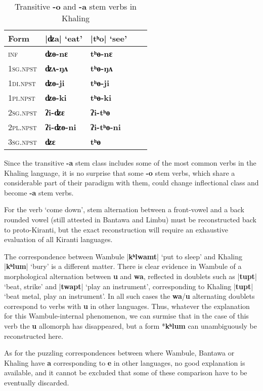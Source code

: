 \documentclass[oldfontcommands,oneside,a4paper,11pt]{article}
\newcommand{\ipa}[1]{\textbf{{\phon\mbox{#1}}}} %
\newcommand{\grise}[1]{\cellcolor{lightgray}\textbf{#1}}
\newcommand{\dhatu}[2]{|\ipa{#1}| `#2'}
\begin{document}
\begin{table}[H]
\caption{Transitive \ipa{-o} and \ipa{-a} stem verbs in Khaling} \centering \label{tab:a.o}
\begin{tabular}{lllll}
\toprule
Form &\dhatu{ʣa}{eat} & \dhatu{tʰo}{see} \\
\midrule
\textsc{inf} & \ipa{ʣɵ-nɛ} \grise{}& \ipa{tʰɵ-nɛ} \grise{}\\
\textsc{1sg.npst} & \ipa{ʣʌ-ŋʌ} & \ipa{tʰɵ-ŋʌ} \\
\textsc{1di.npst} & \ipa{ʣɵ-ji} \grise{}& \ipa{tʰɵ-ji} \grise{}\\
\textsc{1pi.npst} & \ipa{ʣɵ-ki} \grise{}& \ipa{tʰɵ-ki} \grise{}\\
\textsc{2sg.npst} & \ipa{ʔi-ʣɛ} & \ipa{ʔi-tʰɵ} \\
\textsc{2pl.npst} & \ipa{ʔi-ʣɵ-ni} \grise{}& \ipa{ʔi-tʰɵ-ni} \grise{}\\
\textsc{3sg.npst} & \ipa{ʣɛ} & \ipa{tʰɵ} \\
\bottomrule
\end{tabular}
\end{table}

Since the transitive  \ipa{-a} stem class includes some of the most common verbs in the Khaling language, it is no surprise that some \ipa{-o} stem verbs, which share a considerable part of their paradigm with them, could change inflectional class and become  \ipa{-a} stem verbs.

For the verb `come down', stem alternation between a front-vowel and a back rounded vowel (still attested in Bantawa and Limbu) must be reconstructed back to proto-Kiranti, but the exact reconstruction will require an exhaustive evaluation of all Kiranti languages.

The correspondence between Wambule \dhatu{kʰlwamt}{put to sleep} and Khaling \dhatu{kʰlum}{bury}  is a different matter. There is clear evidence in Wambule of a morphological alternation between \ipa{u} and \ipa{wa}, reflected in doublets such as \dhatu{tupt}{beat, strike} and \dhatu{twapt}{play an instrument}, corresponding to Khaling  \dhatu{tupt}{beat metal, play an instrument}. In all such cases the \ipa{wa}/\ipa{u} alternating doublets correspond to verbs with \ipa{u} in other languages. Thus, whatever the explanation for this Wambule-internal phenomenon, we can surmise that in the case of this verb the \ipa{u} allomorph has disappeared, but a form *\ipa{kʰlum} can unambiguously be reconstructed here.



As for the puzzling correspondences between where Wambule, Bantawa or Khaling have \ipa{a} corresponding to \ipa{e} in other languages, no good explanation is available, and it cannot be excluded that some of these comparison have to be eventually discarded.
\end{document}
